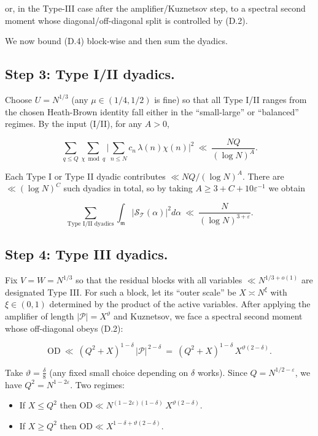\documentclass[11pt]{article}
\theoremstyle{definition}
\theoremstyle{remark}
\begin{document}
or, in the Type-III case after the amplifier/Kuznetsov step, to a spectral second moment whose diagonal/off-diagonal split is controlled by (D.2).

We now bound (D.4) block-wise and then sum the dyadics.


\subsection*{Step 3: Type I/II dyadics.}
Choose $U=N^{1/3}$ (any $\mu\in(1/4,1/2)$ is fine) so that all Type I/II ranges from the chosen Heath-Brown identity fall either in the “small-large” or “balanced” regimes. By the input (I/II), for any $A>0$,

$$
	\sum_{q\le Q}\sum_{\chi\bmod q}
	\Big|\sum_{n\le N} c_n\,\lambda(n)\chi(n)\Big|^2
	\ \ll\ \frac{NQ}{(\log N)^A}.
$$

Each Type I or Type II dyadic contributes $\ll NQ/(\log N)^A$. There are $\ll(\log N)^C$ such dyadics in total, so by taking $A\ge 3+C+10\varepsilon^{-1}$ we obtain

\begin{equation}
	\sum_{\text{Type I/II dyadics}}
	\int_{\mathfrak m}\big|\mathcal S_{\mathcal T}(\alpha)\big|^2 d\alpha
	\ \ll\ \frac{N}{(\log N)^{3+\varepsilon}}.
	\tag{D.5}
\end{equation}

\subsection*{Step 4: Type III dyadics.}
Fix $V=W=N^{1/3}$ so that the residual blocks with all variables $\ll N^{1/3+o(1)}$ are designated Type III. For such a block, let its “outer scale” be $X\asymp N^\xi$ with $\xi\in(0,1)$ determined by the product of the active variables. After applying the amplifier of length $|\mathcal P|=X^\vartheta$ and Kuznetsov, we face a spectral second moment whose off-diagonal obeys (D.2):

$$
	\mathrm{OD}\ \ll\ (Q^2+X)^{1-\delta}\,|\mathcal P|^{\,2-\delta}
	\ =\ (Q^2+X)^{1-\delta}\,X^{\vartheta(2-\delta)}.
$$

Take $\vartheta=\tfrac{\delta}{8}$ (any fixed small choice depending on $\delta$ works). Since $Q=N^{1/2-\varepsilon}$, we have $Q^2=N^{1-2\varepsilon}$. Two regimes:

\begin{itemize}
	\item If $X\le Q^2$ then $\mathrm{OD}\ll N^{(1-2\varepsilon)(1-\delta)}\,X^{\vartheta(2-\delta)}$.
	\item If $X\ge Q^2$ then $\mathrm{OD}\ll X^{1-\delta+\vartheta(2-\delta)}$.
\end{itemize}
\end{document}
